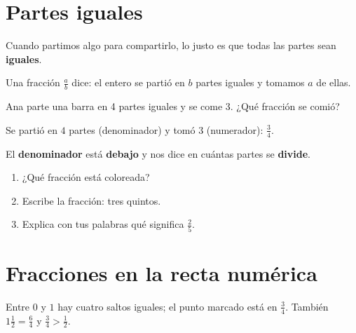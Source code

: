 
\section{Partes iguales}
Cuando partimos algo para compartirlo, lo justo es que todas las partes sean \textbf{iguales}.

\begin{wbidea}
Una fracción $\frac{a}{b}$ dice: el entero se partió en $b$ partes iguales y tomamos $a$ de ellas.
\end{wbidea}

\begin{center}
\qquad {}\qquad {}
\end{center}

\begin{wbexample}
Ana parte una barra en 4 partes iguales y se come 3. ¿Qué fracción se comió?


Se partió en $4$ partes (denominador) y tomó $3$ (numerador): $\frac{3}{4}$.
\end{wbexample}

\begin{wbtip}
El \textbf{denominador} está \textbf{debajo} y nos dice en cuántas partes se \textbf{divide}.
\end{wbtip}

\begin{wbpractice}
\begin{enumerate}
\item ¿Qué fracción está coloreada? \quad {} \quad \wbfracbox
\item Escribe la fracción: tres quintos. \wbblank
\item Explica con tus palabras qué significa $\frac{2}{5}$.
\end{enumerate}
\end{wbpractice}

\section{Fracciones en la recta numérica}

Entre $0$ y $1$ hay cuatro saltos iguales; el punto marcado está en $\frac{3}{4}$. También $1\frac{1}{2} = \frac{6}{4}$ y $\frac{3}{4} > \frac{1}{2}$.

